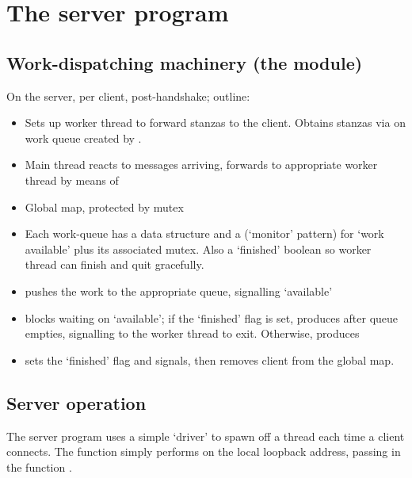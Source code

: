 \documentclass[12pt,a4paper,twoside,openright]{report}
\begin{document}
{\section{The server program}
\subsection{Work-dispatching machinery (the  module)}\label{sec:mod-dispatch}
On the server, per client, post-handshake; outline:

\begin{itemize}
  \item Sets up worker thread to forward stanzas to the client. Obtains stanzas via  on work queue created by .

  \item Main thread reacts to messages arriving, forwards to appropriate worker thread by means of 

  \item Global  map, protected by mutex

  \item Each work-queue has a  data structure and a  (`monitor' pattern) for `work available' plus its associated mutex. Also a `finished' boolean so worker thread can finish and quit gracefully.

  \item {} pushes the work to the appropriate queue, signalling `available'

  \item {} blocks waiting on `available'; if the `finished' flag is set, produces  after queue empties, signalling to the worker thread to exit. Otherwise, produces 

  \item {} sets the `finished' flag and signals, then removes client from the global map.
\end{itemize}

\subsection{Server operation}
The server program uses a simple `driver' to spawn off a thread each time a client connects. The function  simply performs  on the local loopback address, passing in the function .

}
\end{document}
